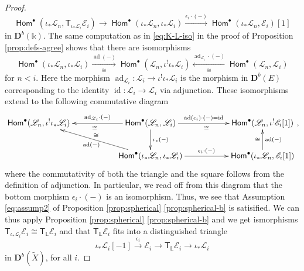 \documentclass[a4paper,11pt, reqno]{amsart}
\def\L{\mathbb L}
\def\DD{\mathbf D}
\def\sE{\mathscr{E}}
\def\sL{\mathscr{L}}
\def\id{{\operatorname{id}}}
\def\ad{{\operatorname{ad}}}
\newcommand{\opname}[1]{\operatorname{\mathsf{#1}}}
\newcommand{\Hom}{\opname{Hom}}
\def\Db{\DD^b}
\newcommand{\bT}{\mathsf{T}}
\theoremstyle{plain}
\theoremstyle{definition}
\numberwithin{equation}{section}
\newlength{\arrow}
\begin{document}
\begin{proof}
\begin{equation}
     \Hom^\bullet ( \iota_\ast \sL_n , \bT_{\iota_\ast \sL_i}\sE_i ) \to \Hom^\bullet ( \iota_\ast \sL_n , \iota_\ast \sL_i ) \xrightarrow{\epsilon_i \cdot (-)}\Hom^\bullet ( \iota_\ast \sL_n , \sE_i  )[1]
    \end{equation}
    in $\Db(\mathbb{k})$.
    The same computation as in  \eqref{eq:K-L-iso} in the proof of Proposition \ref{prop:defs-agree} shows that there are isomorphisms
    \[
    \Hom^\bullet ( \iota_\ast \sL_n , \iota_\ast \sL_i  ) \xrightarrow[\cong]{\ad(-)} \Hom^\bullet ( \sL_n , \iota^! \iota_\ast \sL_i ) \xleftarrow[\cong]{  \ad_{\sL_i} \cdot (-) }  \Hom^\bullet ( \sL_n ,  \sL_i ) 
     \]
     for $n<i$.
     Here the morphism $\ad_{\sL_i} \colon \sL_i \to \iota^! \iota_\ast \sL_i$ is the morphism in $\Db(E)$ corresponding to the identity $\id \colon \sL_i \to \sL_i$ via adjunction.
     These isomorphisms extend to the following commutative diagram
     \begin{equation}
\xymatrix{
   \Hom^\bullet ( \sL_n , \iota^! \iota_\ast \sL_i )  \ar@{<-}[rr]^-{\ad_{\sL_i} \cdot (-)}_\cong  \ar@{<-}[rrd]_{\ad(-)}^\cong & &   \Hom^\bullet (   \sL_n ,  \sL_i ) \ar@{->}[d]^{\iota_\ast (-)} \ar@{->}[rr]^-{ \ad(\epsilon_i )  \cdot (-) = \id  }_\cong & & \Hom^\bullet ( \sL_n , \iota^!\sE_i [1] ) \ar@{<-}[d]^{\ad(-)}_{\cong} \\
  & & \Hom^\bullet ( \iota_\ast \sL_n , \iota_\ast \sL_i ) \ar@{->}[rr]^{\epsilon_i \cdot (-)} & & \Hom^\bullet (  \iota_\ast \sL_n , \sE_i [1] )},
\end{equation}
where the commutativity of both the triangle and the square follows from the definition of adjunction.
In particular, we read off from this diagram that 
the bottom morphism $\epsilon_i \cdot (-)$ is an isomorphism.
Thus, we see that Assumption \eqref{eq:assump2} of Proposition \ref{prop:spherical} \ref{prop:spherical-b} is satisified.
We can thus apply Proposition \ref{prop:spherical} \ref{prop:spherical-b} and we get
ismorphisms
$\bT_{\iota_\ast \sL_i} \sE_i \cong \bT_\L \sE_i$ and that $\bT_\L \sE_i$ fits into a distinguished triangle
   \begin{equation}\label{eq:main-triangle}
            \iota_\ast \sL_i[-1] \xrightarrow{\epsilon_i} \sE_i \to \bT_{\L} \sE_i \to \iota_\ast \sL_i 
    \end{equation}
    in $\Db( \tilde{X} )$, for all $i$.
 

\end{proof}
\end{document}
